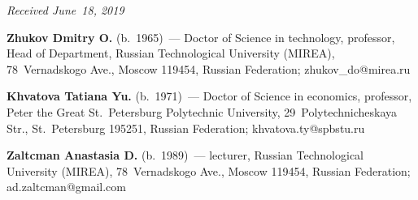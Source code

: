 \vspace*{-3pt}

  \hfill{\small\textit{Received June~18, 2019}}




\Contr

\noindent
\textbf{Zhukov Dmitry O.} (b.\ 1965)~--- 
Doctor of Science in technology, professor, Head of Department, Russian Technological 
University (MIREA), 78~Vernadskogo Ave., Moscow 119454, Russian Federation; 
\mbox{zhukov\_do@mirea.ru}

\vspace*{6pt}

\noindent
\textbf{Khvatova Tatiana Yu.} (b.\ 1971)~--- Doctor of Science in economics, professor, Peter the 
Great St.\ Petersburg Polytechnic University, 29~Polytechnicheskaya Str., St.\ Petersburg 195251, 
Russian Federation; \mbox{khvatova.ty@spbstu.ru}

\vspace*{6pt}

\noindent
\textbf{Zaltcman Anastasia D.} (b.\ 1989)~--- lecturer, Russian Technological University 
(MIREA), 78~Vernadskogo Ave., Moscow 119454, Russian Federation; 
\mbox{ad.zaltcman@gmail.com}

\label{end\stat}

\renewcommand{\bibname}{\protect\rm Литература} 
